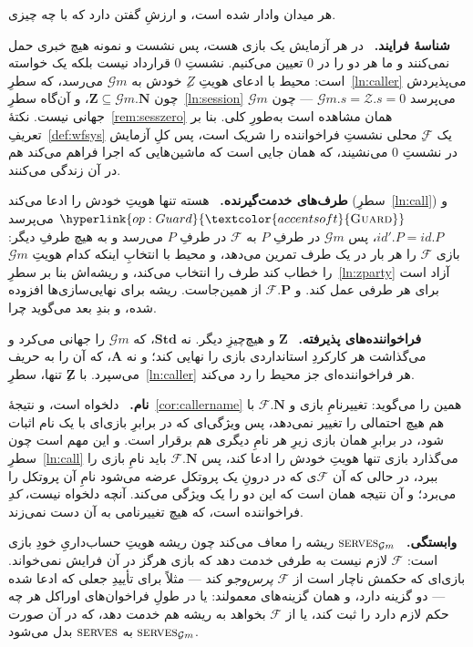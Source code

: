 \documentclass[10pt,oneside,openany]{book}
\newcommand{\Ps}{\mathbf{P}}
\newcommand{\admits}{\mathbf{N}}
\newcommand{\Apid}{\mathbf{A}}
\newcommand{\Zpid}{\mathbf{Z}}
\newcommand{\Stdpid}{\mathbf{Std}}
\newcommand{\serves}{\op{serves}}
\newcommand{\F}{\mathcal{F}}
\newcommand{\Zenv}{\mathcal{Z}}
\newcommand{\op}[1]{\textnormal{\textsc{#1}}}
\newcommand{\opl}[1]{\hyperlink{op:#1}{\textcolor{accentsoft}{\op{#1}}}}
\newcommand{\id}{id}
\newcommand{\Gm}{\mathcal{G}m}
\newcommand{\heading}[1]{\medskip\par\noindent\textcolor{accent}{\textbf{#1.}}\ }
\theoremstyle{accentdef}
\theoremstyle{accentplain}
\begin{document}
هر میدان وادار شده است، و ارزشِ گفتن دارد که با چه چیزی.

\heading{شناسهٔ فرایند} در هر آزمایش یک بازی هست، پس نشست و نمونه هیچ خبری
حمل نمی‌کنند و ما هر دو را در $0$ تعیین می‌کنیم. نشستِ $0$ قرارداد نیست
بلکه یک خواسته است: محیط با ادعای هویتِ $Z$ِ خودش به $\Gm$ می‌رسد، که
سطرِ~\ref{ln:caller} می‌پذیردش چون $\Zpid \subseteq \Gm.\admits$، و آن‌گاه
سطرِ~\ref{ln:session} می‌پرسد $\Gm.s = \Zenv.s = 0$ --- چون $\Gm$ جهانی
نیست. نکتهٔ~\ref{rem:sesszero} همان مشاهده است به‌طورِ کلی. بنا بر
تعریفِ~\ref{def:wfsys} یک $\F$ِ محلی نشستِ فراخواننده را شریک است، پس کلِ
آزمایش در نشستِ $0$ می‌نشیند، که همان جایی است که ماشین‌هایی که اجرا فراهم
می‌کند هم در آن زندگی می‌کنند.

\heading{طرف‌های خدمت‌گیرنده} هسته تنها هویتِ خودش را ادعا می‌کند
(سطرِ~\ref{ln:call}) و $\opl{Guard}$ می‌پرسد $\id'.P = \id.P$، پس $\Gm$ در
طرفِ $P$ به $\F$ در طرفِ $P$ می‌رسد و به هیچ طرفِ دیگر: بازی $\F$ را هر بار
در یک طرف تمرین می‌دهد، و محیط با انتخابِ اینکه کدام هویتِ $\Gm$ را خطاب
کند طرف را انتخاب می‌کند، و ریشه‌اش بنا بر سطرِ~\ref{ln:zparty} آزاد است
برای هر طرفی عمل کند. و $\F.\Ps$ از همین‌جاست. ریشه برای نهایی‌سازی‌ها
افزوده شده، و بندِ بعد می‌گوید چرا.

\heading{فراخواننده‌های پذیرفته} $\Zpid$ و هیچ‌چیزِ دیگر. نه $\Stdpid$، که
$\Gm$ را جهانی می‌کرد و می‌گذاشت هر کارکردِ استانداردی بازی را نهایی کند؛
و نه $\Apid$، که آن را به حریف می‌سپرد. با $\Zpid$ِ تنها،
سطرِ~\ref{ln:caller} هر فراخواننده‌ای جز محیط را رد می‌کند.

\heading{نام} دلخواه است، و نتیجهٔ~\ref{cor:callername} همین را می‌گوید:
تغییرنامِ بازی و $\F.\admits$ با هم هیچ احتمالی را تغییر نمی‌دهد، پس
ویژگی‌ای که در برابرِ بازی‌ای با یک نام اثبات شود، در برابرِ همان بازی زیرِ
هر نامِ دیگری هم برقرار است. و این مهم است چون سطرِ~\ref{ln:call} می‌گذارد
بازی تنها هویتِ خودش را ادعا کند، پس $\F.\admits$ باید نامِ بازی را ببرد،
در حالی که آن $\F$ی که در درونِ یک پروتکل عرضه می‌شود نامِ آن پروتکل را
می‌برد؛ و آن نتیجه همان است که این دو را یک ویژگی می‌کند. آنچه دلخواه
نیست، \emph{کدِ} فراخواننده است، که هیچ تغییرنامی به آن دست نمی‌زند.

\heading{وابستگی} $\serves_{\Gm}$ ریشه را معاف می‌کند چون ریشه هویتِ
حساب‌داریِ خودِ بازی است: $\F$ لازم نیست به طرفی خدمت دهد که بازی هرگز در
آن فرایش نمی‌خواند. بازی‌ای که حکمش ناچار است از $\F$ \emph{پرس‌وجو} کند
--- مثلاً برای تأییدِ جعلی که ادعا شده --- دو گزینه دارد، و همان گزینه‌های
معمولند: یا در طولِ فراخوان‌های اوراکل هر چه حکم لازم دارد را ثبت کند، یا
از $\F$ بخواهد به ریشه هم خدمت دهد، که در آن صورت $\serves_{\Gm}$ به
$\serves$ بدل می‌شود.
\end{document}
